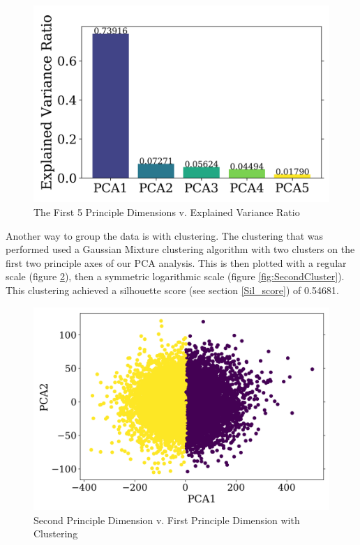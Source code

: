 \documentclass{article}
\begin{document}
\begin{figure}[H]%
\centering
\includegraphics[scale=0.75]{FirstPCA.png}%
\caption{The First 5 Principle Dimensions v. Explained Variance Ratio}
\label{fig:FirstPCA}
\end{figure}

\par
Another way to group the data is with clustering. The clustering that was performed used a Gaussian Mixture clustering algorithm with two clusters on the first two principle axes of our PCA analysis. This is then plotted with a regular scale (figure \ref{fig:FirstCluster}), then a symmetric logarithmic scale (figure \ref{fig:SecondCluster}). This clustering achieved a silhouette score (see section \ref{Sil_score}) of 0.54681.

\begin{figure}[H]
\centering
\includegraphics[scale=0.59]{FirstCluster.png}%
\caption{Second Principle Dimension v. First Principle Dimension with Clustering}
\label{fig:FirstCluster}
\end{figure}
\end{document}
